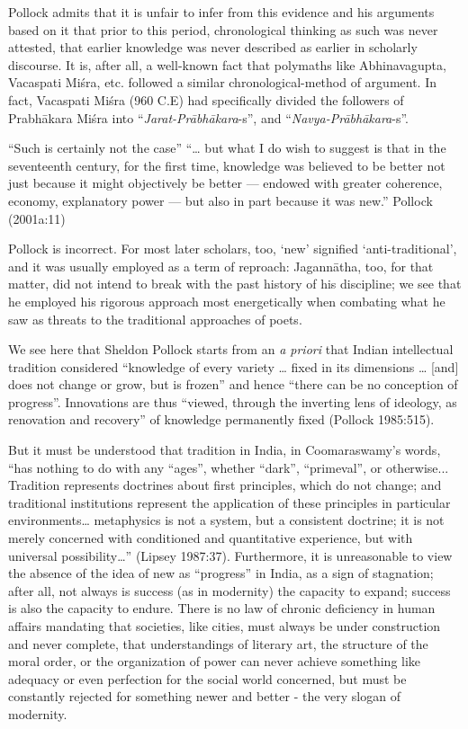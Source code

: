 Pollock admits that it is unfair to infer from this evidence and his arguments based on it that prior to this period, chronological thinking as such was never attested, that earlier knowledge was never described as earlier in scholarly discourse. It is, after all, a well-known fact that polymaths like Abhinavagupta, Vacaspati Miśra, etc. followed a similar chronological-method of argument. In fact, Vacaspati Miśra (960 C.E) had specifically divided the followers of Prabhākara Miśra into “{\sl Jarat-Prābhākara}-s”, and “{\sl Navya-Prābhākara}-s”.  
\begin{myquote}
“Such is certainly not the case”  “… but what I do wish to suggest is that in the seventeenth century, for the first time, knowledge was believed to be better not just because it might objectively be better — endowed with greater coherence, economy, explanatory power — but also in part because it was new.”  \hfill{Pollock (2001a:11)}
\end{myquote}

Pollock is incorrect. For most later scholars, too, ‘new’ signified ‘anti-traditional’, and it was usually employed as a term of reproach: Jagannātha, too, for that matter, did not intend to break with the past history of his discipline; we see that he employed his rigorous approach most energetically when combating what he saw as threats to the traditional approaches of poets.

We see here that Sheldon Pollock starts from an {\sl a priori} that Indian intellectual tradition considered “knowledge of every variety … fixed in its dimensions … [and] does not change or grow, but is frozen” and hence “there can be no conception of progress”. Innovations are thus “viewed, through the inverting lens of ideology, as renovation and recovery” of knowledge permanently fixed (Pollock 1985:515).  

But it must be understood that tradition in India, in Coomaraswamy’s words, “has nothing to do with any “ages”, whether “dark”, “primeval”, or otherwise... Tradition represents doctrines about first principles, which do not change; and traditional institutions represent the application of these principles in particular environments… metaphysics is not a system, but a consistent doctrine; it is not merely concerned with conditioned and quantitative experience, but with universal possibility…” (Lipsey 1987:37). Furthermore, it is unreasonable to view the absence of the idea of new as “progress” in India, as a sign of stagnation; after all, not always is success (as in modernity) the capacity to expand; success is also the capacity to endure. There is no law of chronic deficiency in human affairs mandating that societies, like cities, must always be under construction and never complete, that understandings of literary art, the structure of the moral order, or the organization of power can never achieve something like adequacy or even perfection for the social world concerned, but must be constantly rejected for something newer and better - the very slogan of modernity.  

